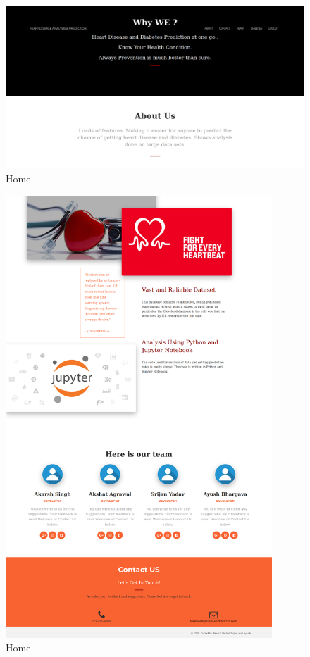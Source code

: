 \documentclass[oneside,12pt]{Classes/VTU}
\begin{document}
    		\begin{figure}
    				\begin{center}
    				\includegraphics[width=17cm]{Screenshots/home2.PNG}
    				\caption{Home}
    				\end{center}
    		\end{figure}
    		
    		\begin{figure}
    				\begin{center}
    				\includegraphics[width=10cm,scale=0.5]{Screenshots/home3.PNG}
    				\caption{Home}
    				\end{center}
    		\end{figure}
    
\end{document}
